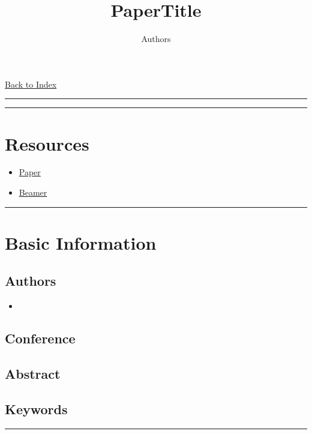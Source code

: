 \documentclass[letterpaper,10pt]{article}
\title{\textbf{PaperTitle}}
\author{Authors}
\newcommand{\panhline}{\begin{center}\rule{\textwidth}{1pt}\end{center}}
\begin{document}
\maketitle

\href{../index.html}{Back to Index}
\panhline

\tableofcontents

\panhline
\section{Resources}

\begin{itemize}

	\item \href{./paper.pdf}{Paper}

	\item \href{./beamer.pdf}{Beamer}

\end{itemize}


\panhline
\section{Basic Information}


\subsection{Authors}

\begin{itemize}

	\item 

\end{itemize}


\subsection{Conference}

\subsection{Abstract}

\subsection{Keywords}

\panhline
\end{document}
